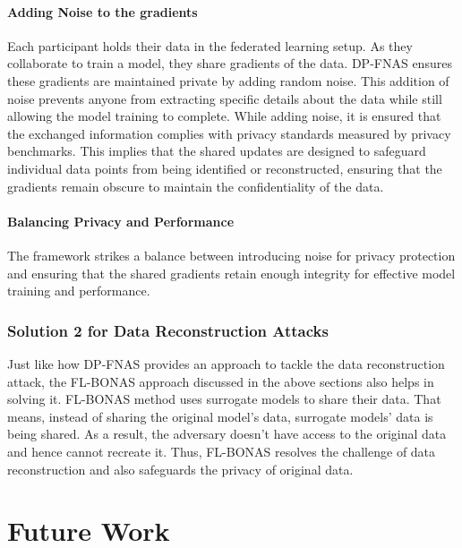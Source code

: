 \documentclass[conference]{IEEEtran}
\begin{document}
\paragraph{Adding Noise to the gradients} Each participant holds their data in the federated learning setup. As they collaborate to train a model, they share gradients of the data. DP-FNAS ensures these gradients are maintained private by adding random noise. This addition of noise prevents anyone from extracting specific details about the data while still allowing the model training to complete.
While adding noise, it is ensured that the exchanged information complies with privacy standards measured by privacy benchmarks. This implies that the shared updates are designed to safeguard individual data points from being identified or reconstructed, ensuring that the gradients remain obscure to maintain the confidentiality of the data.

\paragraph{Balancing Privacy and Performance} The framework strikes a balance between introducing noise for privacy protection and ensuring that the shared gradients retain enough integrity for effective model training and performance.\\

\subsubsection{\textbf{Solution 2 for Data Reconstruction Attacks}}
Just like how DP-FNAS provides an approach to tackle the data reconstruction attack, the FL-BONAS approach discussed in the above sections also helps in solving it. FL-BONAS method uses surrogate models to share their data. That means, instead of sharing the original model's data, surrogate models' data is being shared. As a result, the adversary doesn't have access to the original data and hence cannot recreate it. Thus, FL-BONAS resolves the challenge of data reconstruction and also safeguards the privacy of original data.

\section{Future Work}
\end{document}
